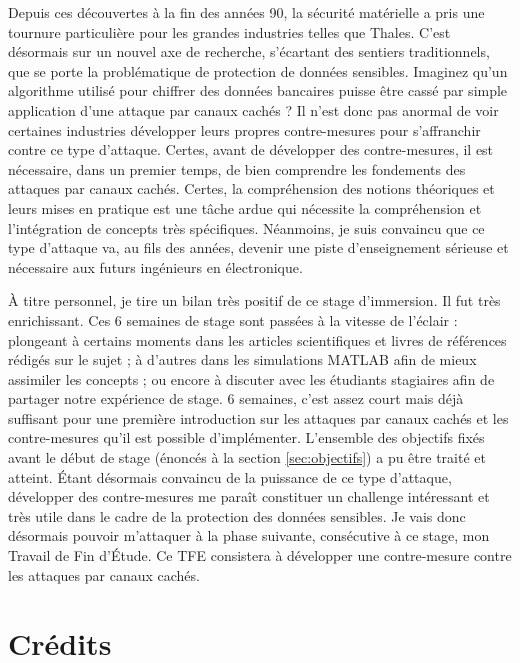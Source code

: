 \documentclass[oneside]{book}
\begin{document}
Depuis ces découvertes à la fin des années 90, la sécurité matérielle a pris une tournure particulière pour les grandes industries telles que Thales. C'est désormais sur un nouvel axe de recherche, s'écartant des sentiers traditionnels, que se porte la problématique de protection de données sensibles. Imaginez qu'un algorithme utilisé pour chiffrer des données bancaires puisse être cassé par simple application d'une attaque par canaux cachés ? Il n'est donc pas anormal de voir certaines industries développer leurs propres contre-mesures pour s'affranchir contre ce type d'attaque. Certes, avant de développer des contre-mesures, il est nécessaire, dans un premier temps, de bien comprendre les fondements des attaques par canaux cachés. Certes, la compréhension des notions théoriques et leurs mises en pratique est une tâche ardue qui nécessite la compréhension et l'intégration de concepts très spécifiques. Néanmoins, je suis convaincu que ce type d'attaque va, au fils des années, devenir une piste d'enseignement sérieuse et nécessaire aux futurs ingénieurs en électronique.

À titre personnel, je tire un bilan très positif de ce stage d'immersion. Il fut très enrichissant. Ces 6 semaines de stage sont passées à la vitesse de l'éclair : plongeant à certains moments dans les articles scientifiques et livres de références rédigés sur le sujet ; à d'autres dans les simulations MATLAB afin de mieux assimiler les concepts ; ou encore à discuter avec les étudiants stagiaires afin de partager notre expérience de stage. 6 semaines, c'est assez court mais déjà suffisant pour une première introduction sur les attaques par canaux cachés et les contre-mesures qu'il est possible d'implémenter. L'ensemble des objectifs fixés avant le début de stage (énoncés à la section \ref{sec:objectifs}) a pu être traité et atteint. Étant désormais convaincu de la puissance de ce type d'attaque, développer des contre-mesures me paraît constituer un challenge intéressant et très utile dans le cadre de la protection des données sensibles. Je vais donc désormais pouvoir m'attaquer à la phase suivante, consécutive à ce stage, mon Travail de Fin d'Étude. Ce TFE consistera à développer une contre-mesure contre les attaques par canaux cachés.




\newpage
\section*{Crédits}
\end{document}
